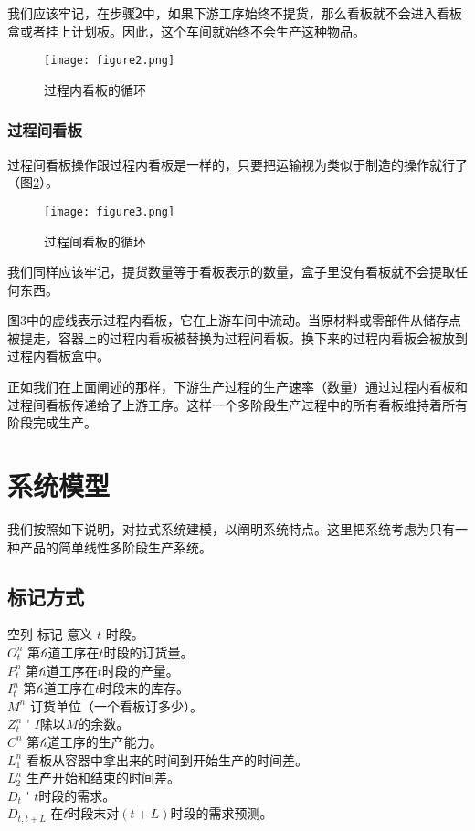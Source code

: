 我们应该牢记，在步骤\textcircled{2}中，如果下游工序始终不提货，那么看板就不会进入看板盒或者挂上计划板。因此，这个车间就始终不会生产这种物品。

\begin{figure}[htbp]
\centering
\texttt{[image: figure2.png]}
\caption{过程内看板的循环}
\label{fig:in-process}
\end{figure}

\subsubsection{过程间看板}

过程间看板操作跟过程内看板是一样的，只要把运输视为类似于制造的操作就行了（图\ref{fig:inter-process}）。

\begin{figure}[htbp]
\centering
\texttt{[image: figure3.png]}
\caption{过程间看板的循环}
\label{fig:inter-process}
\end{figure}

我们同样应该牢记，提货数量等于看板表示的数量，盒子里没有看板就不会提取任何东西。

图3中的虚线表示过程内看板，它在上游车间中流动。当原材料或零部件从储存点被提走，容器上的过程内看板被替换为过程间看板。换下来的过程内看板会被放到过程内看板盒中。

正如我们在上面阐述的那样，下游生产过程的生产速率（数量）通过过程内看板和过程间看板传递给了上游工序。这样一个多阶段生产过程中的所有看板维持着所有阶段完成生产。





\section{系统模型}

我们按照如下说明，对拉式系统建模，以阐明系统特点。这里把系统考虑为只有一种产品的简单线性多阶段生产系统。

\subsection{标记方式}

\begin{tabbing}
空列 \= 标记 \= 意义 \kill
\>\> $t$ \' 时段。 \\
\>\> $O_t^n$ \' 第$n$道工序在$t$时段的订货量。 \\
\>\> $P_t^n$ \' 第$n$道工序在$t$时段的产量。 \\
\>\> $I_t^n$ \' 第$n$道工序在$t$时段末的库存。 \\
\>\> $M^n$ \' 订货单位（一个看板订多少）。 \\
\>\> $Z_t^n$ \' $I$除以$M$的余数。 \\
\>\> $C^n$ \' 第$n$道工序的生产能力。 \\
\>\> $L_1^n$ \' 看板从容器中拿出来的时间到开始生产的时间差。 \\
\>\> $L_2^n$ \' 生产开始和结束的时间差。 \\
\>\> $D_t$ \' $t$时段的需求。 \\
\>\> $D_{t,t+L}$ \' 在$t$时段末对$(t+L)$时段的需求预测。
\end{tabbing}

